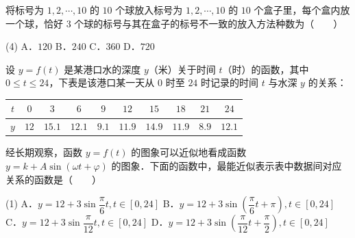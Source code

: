 \begin{question}
将标号为 $1, 2, \cdots, 10$ 的 $10$ 个球放入标号为 $1, 2, \cdots, 10$ 的 $10$ 个盒子里，每个盒内放一个球，恰好 $3$ 个球的标号与其在盒子的标号不一致的放入方法种数为\mbox{（　　）}

\begin{gkopts}(4)
\task A．$120$
\task B．$240$
\task C．$360$
\task D．$720$
\end{gkopts}

\end{question}
\begin{question}
设 $y = f(t)$ 是某港口水的深度 $y$（米）关于时间 $t$（时）的函数，其中 $0 \leqslant t \leqslant 24$，下表是该港口某一天从 $0$ 时至 $24$ 时记录的时间 $t$ 与水深 $y$ 的关系：

\begin{center}
\begingroup\setlength{\tabcolsep}{4pt}
\begin{tabular}{cccccccccc}
\toprule
$t$ & $0$ & $3$ & $6$ & $9$ & $12$ & $15$ & $18$ & $21$ & $24$ \\
\midrule
$y$ & $12$ & $15.1$ & $12.1$ & $9.1$ & $11.9$ & $14.9$ & $11.9$ & $8.9$ & $12.1$ \\
\bottomrule
\end{tabular}
\endgroup
\end{center}

经长期观察，函数 $y = f(t)$ 的图象可以近似地看成函数 $y = k + A\sin(\omega t + \varphi)$ 的图象．下面的函数中，最能近似表示表中数据间对应关系的函数是\mbox{（　　）}

\begin{gkopts}(1)
\task A．$y = 12 + 3\sin\dfrac{\pi}{6}t, t \in [0, 24]$
\task B．$y = 12 + 3\sin\left(\dfrac{\pi}{6}t + \pi\right), t \in [0, 24]$
\task C．$y = 12 + 3\sin\dfrac{\pi}{12}t, t \in [0, 24]$
\task D．$y = 12 + 3\sin\left(\dfrac{\pi}{12}t + \dfrac{\pi}{2}\right), t \in [0, 24]$
\end{gkopts}

\end{question}

